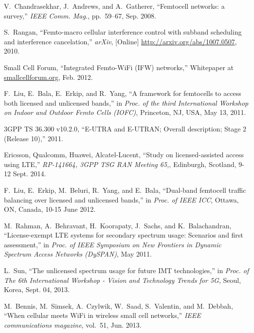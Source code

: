 \documentclass[journal,final,letterpaper,10pt,doublecolumn,twoside]{IEEEtran}
\begin{document}

\begin{thebibliography}{10}

V.~Chandrasekhar, J.~Andrews, and A.~Gatherer, ``Femtocell networks: a
  survey,'' {\em IEEE Comm. Mag.}, pp.~59--67, Sep. 2008.

S.~Rangan, ``Femto-macro cellular interference control with subband scheduling
  and interference cancelation,'' {\em arXiv}, [Online]
  \url{http://arxiv.org/abs/1007.0507}, 2010.

{Small Cell Forum}, ``{Integrated Femto-WiFi (IFW) networks},'' Whitepaper at
  \url{smallcellforum.org}, Feb. 2012.

F.~Liu, E.~Bala, E.~Erkip, and R.~Yang, ``A framework for femtocells to access
  both licensed and unlicensed bands,'' in {\em Proc. of the third
  International Workshop on Indoor and Outdoor Femto Cells (IOFC)}, Princeton,
  NJ, USA, May 13, 2011.

{3GPP TS 36.300 v10.2.0}, ``{E-UTRA and E-UTRAN; Overall description; Stage 2
  (Release 10)},'' 2011.

{Ericsson, Qualcomm, Huawei, Alcatel-Lucent}, ``{Study on licensed-assisted
  access using LTE},'' {\em RP-141664, 3GPP TSG RAN Meeting 65,}, Edinburgh,
  Scotland, 9-12 Sept. 2014.

F.~Liu, E.~Erkip, M.~Beluri, R.~Yang, and E.~Bala, ``Dual-band femtocell
  traffic balancing over licensed and unlicensed bands,'' in {\em Proc. of IEEE
  ICC}, Ottawa, ON, Canada, 10-15 June 2012.

M.~Rahman, A.~Behravant, H.~Koorapaty, J.~Sachs, and K.~Balachandran,
  ``{License-exempt LTE systems for secondary spectrum usage: Scenarios and
  first assessment},'' in {\em Proc. of IEEE Symposium on New Frontiers in
  Dynamic Spectrum Access Networks (DySPAN)}, May 2011.

L.~Sun, ``The unlicensed spectrum usage for future {IMT} technologies,'' in
  {\em Proc. of The 6th International Workshop - Vision and Technology Trends
  for 5G}, Seoul, Korea, Sept. 04, 2013.

M.~Bennis, M.~Simsek, A.~Czylwik, W.~Saad, S.~Valentin, and M.~Debbah, ``{When
  cellular meets WiFi in wireless small cell networks},'' {\em {IEEE
  communications magazine}}, vol.~51, Jun. 2013.


\end{thebibliography}
\end{document}
